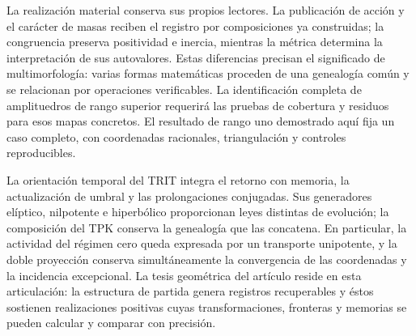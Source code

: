 \documentclass[a4paper,10pt]{article}
\theoremstyle{definition}\newtheorem{definition}[theorem]{Definición}
\theoremstyle{remark}\newtheorem{remark}[theorem]{Observación}
\numberwithin{equation}{section}
\begin{document}
La realización material conserva sus propios lectores. La publicación de
acción y el carácter de masas reciben el registro por composiciones ya
construidas; la congruencia preserva positividad e inercia, mientras la
métrica determina la interpretación de sus autovalores. Estas diferencias
precisan el significado de multimorfología: varias formas matemáticas
proceden de una genealogía común y se relacionan por operaciones verificables.
La identificación completa de amplituedros de rango superior requerirá
las pruebas de cobertura y residuos para esos mapas concretos. El resultado
de rango uno demostrado aquí fija un caso completo, con coordenadas
racionales, triangulación y controles reproducibles.

La orientación temporal del TRIT integra el retorno con memoria, la
actualización de umbral y las prolongaciones conjugadas. Sus generadores
elíptico, nilpotente e hiperbólico proporcionan leyes distintas de
evolución; la composición del TPK conserva la genealogía que las
concatena. En particular, la actividad del régimen cero queda expresada
por un transporte unipotente, y la doble proyección conserva simultáneamente
la convergencia de las coordenadas y la incidencia excepcional. La tesis
geométrica del artículo reside en esta articulación: la estructura de
partida genera registros recuperables y éstos sostienen realizaciones
positivas cuyas transformaciones, fronteras y memorias se pueden calcular
y comparar con precisión.
\end{document}

